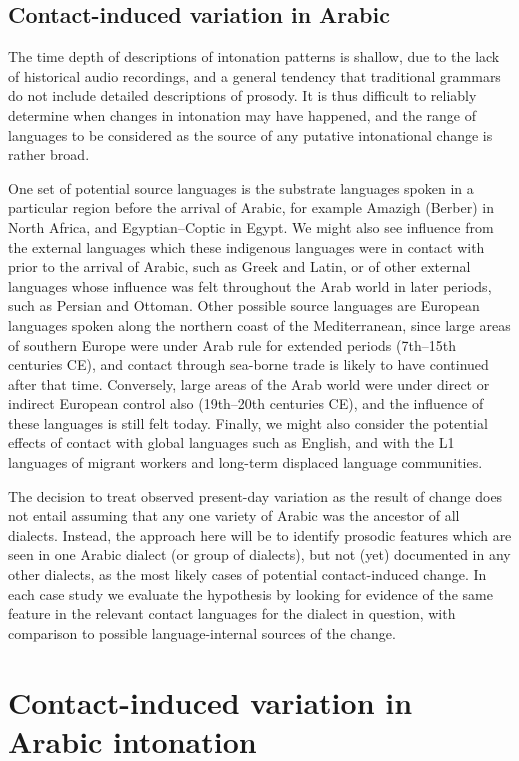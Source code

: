 \documentclass[output=paper]{langsci/langscibook}
\begin{document}
 
 \subsection{Contact-induced variation in Arabic} \label{aravar}


The time depth of descriptions of intonation patterns is shallow, due to the lack of historical audio recordings, and a general tendency that traditional grammars do not include detailed descriptions of prosody. It is thus difficult to reliably determine when changes in intonation may have happened, and the range of languages to be considered as the source of any putative intonational change is rather broad. 

One set of potential source languages is the substrate languages spoken in a particular region before the arrival of Arabic, for example Amazigh (Berber) in North Africa, and Egyptian--Coptic in Egypt. We might also see influence from the external languages which these indigenous languages were in contact with prior to the arrival of Arabic, such as Greek and Latin, or of other external languages whose influence was felt throughout the Arab world in later periods, such as Persian and Ottoman. Other possible source languages are European languages spoken along the northern coast of the Mediterranean, since large areas of southern Europe were under Arab rule for extended periods (7th--15th centuries CE), and contact through sea-borne trade is likely to have continued after that time. Conversely, large areas of the Arab world were under direct or indirect European control also (19th--20th centuries CE), and the influence of these languages is still felt today. Finally, we might also consider the potential effects of contact with global languages such as English, and with the L1 languages of migrant workers and long-term displaced language communities.

The decision to treat observed present-day variation as the result of change does not entail assuming that any one variety of Arabic was the ancestor of all dialects. Instead, the approach here will be to identify prosodic features which are seen in one Arabic dialect (or group of dialects), but not (yet) documented in any other dialects, as the most likely cases of potential contact-induced change. In each case study we evaluate the hypothesis by looking for evidence of the same feature in the relevant contact languages for the dialect in question, with comparison to possible language-internal sources of the change. 


 \section{Contact-induced variation in Arabic intonation} \label{araint}
\end{document}
